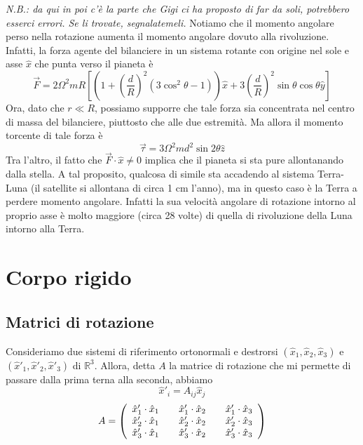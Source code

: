 \documentclass[a4paper,11pt]{article}
\begin{document}
\noindent \textit{N.B.: da qui in poi c'è la parte che Gigi ci ha proposto di far da soli, potrebbero esserci errori. Se li trovate, segnalatemeli.}
\noindent Notiamo che il momento angolare perso nella rotazione aumenta il momento angolare dovuto alla rivoluzione. Infatti, la forza agente del bilanciere in un sistema rotante con origine nel sole e asse $\hat{x}$ che punta verso il pianeta è 
$$\vec{F}=2\Omega^2mR\left[\left(1+\left(\frac{d}{R}\right)^2\left(3\cos^2\theta-1\right)\right)\hat{x}+3\left(\frac{d}{R}\right)^2\sin\theta\cos\theta\hat{y}\right]$$
Ora, dato che $r\ll R$, possiamo supporre che tale forza sia concentrata nel centro di massa del bilanciere, piuttosto che alle due estremità. Ma allora il momento torcente di tale forza è 
$$\vec{\tau}=3\Omega^2md^2\sin2\theta\hat{z}$$
Tra l'altro, il fatto che $\vec{F}\cdot\hat{x}\neq0$ implica che il pianeta si sta pure allontanando dalla stella. A tal proposito, qualcosa di simile sta accadendo al sistema Terra-Luna (il satellite si allontana di circa 1 cm l'anno), ma in questo caso è la Terra a perdere momento angolare. Infatti la sua velocità angolare di rotazione intorno al proprio asse è molto maggiore (circa 28 volte) di quella di rivoluzione della Luna intorno alla Terra.
\newpage
\section{Corpo rigido}
\subsection{Matrici di rotazione}
Consideriamo due sistemi di riferimento ortonormali e destrorsi $(\hat{x}_1,\hat{x}_2,\hat{x}_3)$ e $(\hat{x}'_1,\hat{x}'_2,\hat{x}'_3)$ di $\mathbb{R}^3$. Allora, detta $A$ la matrice di rotazione che mi permette di passare dalla prima terna alla seconda, abbiamo
$$\hat{x}'_i=A_{ij}\hat{x}_j$$
$$A=\left(\begin{array}{c c c c c}
\hat{x}'_1\cdot\hat{x}_1 & & \hat{x}'_1\cdot\hat{x}_2 & & \hat{x}'_1\cdot\hat{x}_3 \\
\hat{x}'_2\cdot\hat{x}_1 & &\hat{x}'_2\cdot\hat{x}_2 & & \hat{x}'_2\cdot\hat{x}_3 \\
\hat{x}'_3\cdot\hat{x}_1 & &\hat{x}'_3\cdot\hat{x}_2 & & \hat{x}'_3\cdot\hat{x}_3 \\
\end{array}\right)$$
\end{document}
